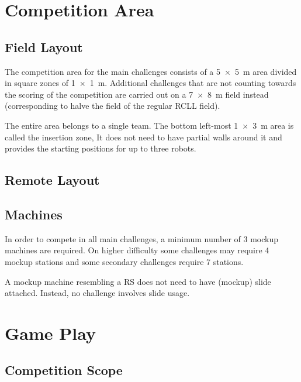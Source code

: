 \documentclass[12pt,twoside]{article}
\begin{document}
\section{Competition Area}
\subsection{Field Layout}
The competition area for the main challenges consists of a \SI{5 x 5}{\metre}
area divided in square zones of \SI{1 x 1}{\metre}. Additional challenges that
are not counting towards the scoring of the competition are carried out on
a \SI{7 x 8}{\metre} field instead (corresponding to halve the field of the
regular \ac{RCLL} field).


The entire area belongs to a single team. The bottom left-most
\SI{1 x 3}{\metre} area is called the insertion zone, It does not need to have
partial walls around it and provides the starting positions for up to three
robots.
\subsection{Remote Layout}
\subsection{Machines}

In order to compete in all main challenges, a minimum number of 3 mockup
machines are required. On higher difficulty some challenges may require
4 mockup stations and some secondary challenges require 7 stations.

A mockup machine resembling a \ac{RS} does not need to have (mockup) slide
attached. Instead, no challenge involves slide usage.
\section{Game Play}
\subsection{Competition Scope}
\end{document}
